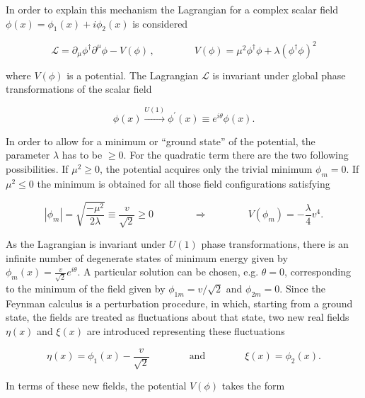In order to explain this mechanism the Lagrangian for a complex scalar field $\phi(x) = \phi_1(x) + i\phi_2(x)$ is considered

\begin{equation}\label{eqn:SM_e21}
\mathcal{L} = \partial_\mu\phi^\dag\partial^\mu\phi - V(\phi) \, , \qquad\qquad V(\phi) = \mu^2\phi^\dag\phi + \lambda(\phi^\dag\phi)^2
\end{equation}

\noindent where $V(\phi)$ is a potential. 
The Lagrangian $\mathcal{L}$ is invariant under global phase transformations of the scalar field

\begin{equation}\label{eqn:SM_e22}
\phi(x) \xrightarrow{U(1)} \phi^\prime(x) \equiv e^{i\theta} \phi(x).
\end{equation}

In order to allow for a minimum or ``ground state'' of the potential, the parameter $\lambda$ has to be $\geq 0$. For the quadratic term there are the two following possibilities.
If $\mu^2 \geq 0$, the potential acquires only the trivial minimum $\phi_m = 0$. If $\mu^2 \leq 0$ the minimum is obtained for all those field configurations satisfying

\begin{equation}\label{eqn:SM_e23}
|\phi_m| = \sqrt{\frac{-\mu^2}{2\lambda}} \equiv \frac{v}{\sqrt{2}} \geq 0 \qquad\qquad \Rightarrow \qquad\qquad V(\phi_m) = -\frac{\lambda}{4}v^4.
\end{equation}

As the Lagrangian is invariant under $U(1)$ phase transformations, there is an infinite number of degenerate states of minimum energy given by 
$\phi_m(x) = \frac{v}{\sqrt{2}}e^{i\theta}$.
A particular solution can be chosen, e.g. $\theta = 0$, corresponding to the minimum of the field given by $\phi_{1m} = v/\sqrt{2}$ and $\phi_{2m} = 0$.
Since the Feynman calculus is a perturbation procedure, in which, starting from a ground state, the fields are treated as fluctuations about that state,
two new real fields $\eta(x)$ and $\xi(x)$ are introduced representing these fluctuations

\begin{equation}\label{eqn:SM_e24}
\eta(x) = \phi_1(x) - \frac{v}{\sqrt{2}} \qquad\qquad \mbox{and} \qquad\qquad \xi(x) = \phi_2(x).
\end{equation}

In terms of these new fields, the potential $V(\phi)$ takes the form

